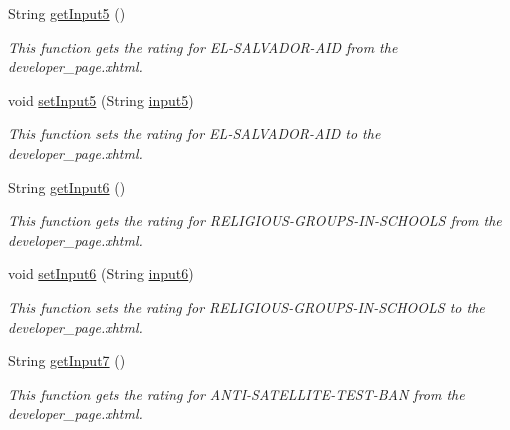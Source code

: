\begin{DoxyCompactItemize}
String \hyperlink{classorg_1_1jboss_1_1as_1_1quickstarts_1_1greeter_1_1web_1_1_general_controller_a82ecfd53f0265fb359d46a544966242e}{get\+Input5} ()
\begin{DoxyCompactList}\small\item\em This function gets the rating for E\+L-\/\+S\+A\+L\+V\+A\+D\+O\+R-\/\+A\+ID from the developer\+\_\+page.\+xhtml. \end{DoxyCompactList}\item 
void \hyperlink{classorg_1_1jboss_1_1as_1_1quickstarts_1_1greeter_1_1web_1_1_general_controller_ad96ac154b5cfcd08e7c4b59d26c12ef1}{set\+Input5} (String \hyperlink{classorg_1_1jboss_1_1as_1_1quickstarts_1_1greeter_1_1web_1_1_general_controller_a457290e7ba89cc088540d8bef2b6656a}{input5})
\begin{DoxyCompactList}\small\item\em This function sets the rating for E\+L-\/\+S\+A\+L\+V\+A\+D\+O\+R-\/\+A\+ID to the developer\+\_\+page.\+xhtml. \end{DoxyCompactList}\item 
String \hyperlink{classorg_1_1jboss_1_1as_1_1quickstarts_1_1greeter_1_1web_1_1_general_controller_ae271a7e5650ec4a0ab7f5aca7bfdea36}{get\+Input6} ()
\begin{DoxyCompactList}\small\item\em This function gets the rating for R\+E\+L\+I\+G\+I\+O\+U\+S-\/\+G\+R\+O\+U\+P\+S-\/\+I\+N-\/\+S\+C\+H\+O\+O\+LS from the developer\+\_\+page.\+xhtml. \end{DoxyCompactList}\item 
void \hyperlink{classorg_1_1jboss_1_1as_1_1quickstarts_1_1greeter_1_1web_1_1_general_controller_a1e2143184418c2a474cee40512000944}{set\+Input6} (String \hyperlink{classorg_1_1jboss_1_1as_1_1quickstarts_1_1greeter_1_1web_1_1_general_controller_a03a99f68443bf89e403057aaf9526775}{input6})
\begin{DoxyCompactList}\small\item\em This function sets the rating for R\+E\+L\+I\+G\+I\+O\+U\+S-\/\+G\+R\+O\+U\+P\+S-\/\+I\+N-\/\+S\+C\+H\+O\+O\+LS to the developer\+\_\+page.\+xhtml. \end{DoxyCompactList}\item 
String \hyperlink{classorg_1_1jboss_1_1as_1_1quickstarts_1_1greeter_1_1web_1_1_general_controller_a623fc4b8b1562176f2b50875ad778e26}{get\+Input7} ()
\begin{DoxyCompactList}\small\item\em This function gets the rating for A\+N\+T\+I-\/\+S\+A\+T\+E\+L\+L\+I\+T\+E-\/\+T\+E\+S\+T-\/\+B\+AN from the developer\+\_\+page.\+xhtml. \end{DoxyCompactList}\item 

\end{DoxyCompactItemize}

